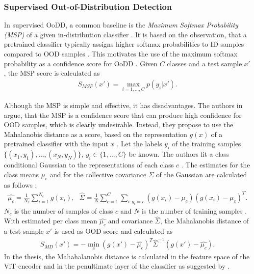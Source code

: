 \subsubsection{Supervised Out-of-Distribution Detection}
In supervised OoDD, a common baseline is the \textit{Maximum Softmax Probability (MSP)} of a given in-distribution classifier \citep{Hendrycks2016a}.
It is based on the observation, that a pretrained classifier typically assigns higher softmax probabilities to ID samples compared to OOD samples \citep{Hendrycks2016a}.
This motivates the use of the maximum softmax probability as a confidence score for OoDD \citep{Hendrycks2016a}.
Given $C$ classes and a test sample $x'$, the MSP score is calculated as 
\begin{align}
	S_{MSP}(x')=\max_{i=1,\dots,C}p(y_i|x').
\end{align}	
\par
Although the MSP is simple and effective, it has disadvantages.
The authors in \citep{Lee2018} argue, that the MSP is a confidence score that can produce high confidence for OOD samples, which is clearly undesirable.
Instead, they propose to use the Mahalanobis distance as a score, based on the representation $g(x)$ of a pretrained classifier with the input $x$ \citep{Lee2018}.
Let the labels $y_i$ of the training samples $\{(x_1,y_1),\dots, (x_N,y_N)\}$, $y_i \in \{1,\dots,C\}$ be known.
The authors fit a class conditional Gaussian to the representations of each class $c$ \citep{Lee2018}.
The estimates for the class means $\mu_c$ and for the collective covariance $\Sigma$ of the Gaussian are calculated as follows \citep{Lee2018}:
\begin{align}
	\hat{\mu_c} = \frac{1}{N_c}\sum_{i=1}^{N_c}g(x_i), \hspace{8pt} \hat{\Sigma} = \frac{1}{N}\sum_{c=1}^{C}\sum_{i: y_i=c}(g(x_i)-\mu_c)(g(x_i)-\mu_c)^T.
\end{align}
$N_c$ is the number of samples of class $c$ and $N$ is the number of training samples \citep{Lee2018}.
With estimated per class mean $\hat{\mu_c}$ and covariance $\hat{\Sigma}$, the Mahalanobis distance of a test sample $x'$ is used as OOD score and calculated as \citep{Lee2018}
\begin{align}
	S_{MD}(x') = - \min_c (g(x')-\hat{\mu_c})^T\hat{\Sigma}^{-1}(g(x')-\hat{\mu_c}).
\end{align}
In the thesis, the Mahahalanobis distance is calculated in the feature space of the ViT encoder and in the penultimate layer of the classifier as suggested by \citep{Lee2018, Michels2023}.
